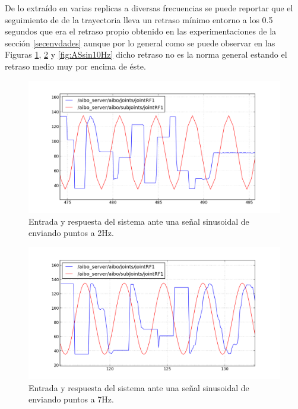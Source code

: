\documentclass[12pt,a4paper,final,twoside]{article}
\begin{document}
De lo extraído en varias replicas a diversas frecuencias se puede reportar que el seguimiento de de la trayectoria lleva un retraso mínimo entorno a los 0.5 segundos que era el retraso propio obtenido en las experimentaciones de la sección \ref{secenvdades} aunque por lo general como se puede observar en las Figuras \ref{fig:ASsin2Hz}, \ref{fig:ASsin7Hz} y \ref{fig:ASsin10Hz} 
dicho retraso no es la norma general estando el retraso medio muy por encima de éste.
\begin{figure}[H]
	\centering
    \includegraphics[scale=0.66]{images/sinlegWR/10Ry2S.png}
 	\caption{Entrada y respuesta del sistema ante una señal sinusoidal de enviando puntos a 2Hz.}
  \label{fig:ASsin2Hz}
\end{figure}
\begin{figure}[H]
	\centering
    \includegraphics[scale=0.66]{images/sinlegWR/10Ry7S.png}
 	\caption{Entrada y respuesta del sistema ante una señal sinusoidal de enviando puntos a 7Hz.}
  \label{fig:ASsin7Hz}
\end{figure}
\end{document}
